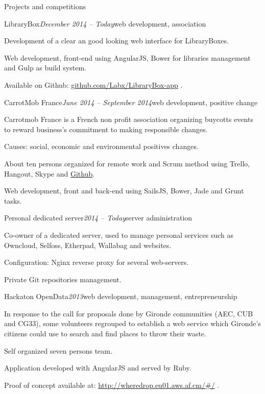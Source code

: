 \begin{rSection}{Projects and competitions}

  \begin{rSubsection}{LibraryBox}{\em December 2014 -- Today}{web development, association}{}
    \item[] Development of a clear an good looking web interface for LibraryBoxes.
    \item Web development, front-end using AngularJS, Bower for libraries management and Gulp as build system.
    \item Available on Github: \href{https://github.com/Labx/LibraryBox-app}{github.com/Labx/LibraryBox-app} .
  \end{rSubsection}

  \begin{rSubsection}{CarrotMob France}{\em June 2014 -- September 2014}{web development, positive change}{}
    \item[] Carrotmob France is a French non profit association organizing buycotts events to reward business's commitment to making responsible changes.
    \item Causes: social, economic and environmental positives changes.
    \item About ten persons organized for remote work and Scrum method using Trello, Hangout, Skype and \href{https://github.com/carrotcommunity/carrotmobfrance}{Github}.
    \item Web development, front and back-end using SailsJS, Bower, Jade and Grunt tasks.
  \end{rSubsection}

  \begin{rSubsection}{Personal dedicated server}{\em 2014 -- Today}{server administration}{}
    \item[] Co-owner of a dedicated server, used to manage personal services such as Owncloud, Selfoss, Etherpad, Wallabag and websites.
    \item Configuration: Nginx reverse proxy for several web-servers.
    \item Private Git repositories management.
  \end{rSubsection}

  \begin{rSubsection}{Hackaton OpenData}{\em 2013}{web development, management, entrepreneurship}{}
    \item[] In response to the call for proposals done by Gironde communities (AEC, CUB and CG33), some volunteers regrouped to establish a web service which Gironde's citizens could use to search and find places to throw their waste.
    \item Self organized seven persons team.
    \item Application developed with AngularJS and served by Ruby.
    \item Proof of concept available at: \href{http://wheredrop.eu01.aws.af.cm/#/}{http://wheredrop.eu01.aws.af.cm/\#/} .
  \end{rSubsection}


\end{rSection}
